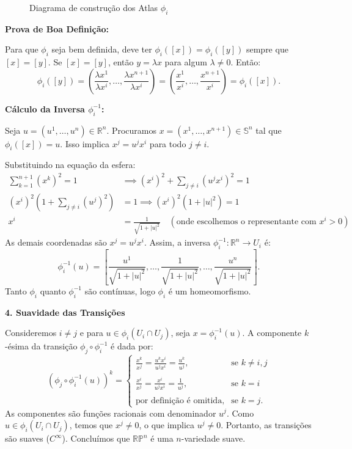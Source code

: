 {\begin{figure}[htbp]
		\caption{Diagrama de construção dos Atlas $\phi_i$}
	\end{figure}
	
	\textbf{Prova de Boa Definição:} 
	
	Para que $\phi_i$ seja bem definida, deve ter $\phi_i([x]) = \phi_i([y])$ sempre que $[x] = [y]$. Se $[x] = [y]$, então $y = \lambda x$ para algum $\lambda \neq 0$. Então:
	$$ \phi_i([y]) = \left( \frac{\lambda x^1}{\lambda x^i}, \dots, \frac{\lambda x^{n+1}}{\lambda x^i} \right) = \left( \frac{x^1}{x^i}, \dots, \frac{x^{n+1}}{x^i} \right) = \phi_i([x]).$$
	
	\textbf{Cálculo da Inversa $\phi_i^{-1}$:}
	
	Seja $u = (u^1, \dots, u^n) \in \mathbb{R}^n$. Procuramos $x = (x^1, \dots, x^{n+1}) \in \mathbb{S}^n$ tal que $\phi_i([x]) = u$. Isso implica $x^j = u^j x^i$ para todo $j \neq i$. 
	
	Substituindo na equação da esfera:
	\begin{align*}
		\sum_{k=1}^{n+1} (x^k)^2 = 1 &\implies (x^i)^2 + \sum_{j \neq i} (u^j x^i)^2 = 1 \\
		(x^i)^2 (1 + \sum_{j \neq i} (u^j)^2) &= 1 \implies (x^i)^2 (1 + |u|^2) = 1 \\
		x^i &= \frac{1}{\sqrt{1+|u|^2}} \quad (\text{onde escolhemos o representante com } x^i > 0)
	\end{align*}
	As demais coordenadas são $x^j = u^j x^i$. Assim, a inversa $\phi_i^{-1}: \mathbb{R}^n \to U_i$ é:
	$$ \phi_i^{-1}(u) = \left[ \frac{u^1}{\sqrt{1+|u|^2}}, \dots, \frac{1}{\sqrt{1+|u|^2}}, \dots, \frac{u^n}{\sqrt{1+|u|^2}} \right].$$
	Tanto $\phi_i$ quanto $\phi_i^{-1}$ são contínuas, logo $\phi_i$ é um homeomorfismo.
	
	\textbf{4. Suavidade das Transições}
	
	Consideremos $i \neq j$ e para $u \in \phi_i(U_i \cap U_j)$, seja $x = \phi_i^{-1}(u)$. A componente $k$-ésima da transição $\phi_j \circ \phi_i^{-1}$ é dada por:
	$$ 
	(\phi_j \circ \phi_i^{-1}(u))^k = \begin{cases} 
		\frac{x^k}{x^j} = \frac{u^k x^i}{u^j x^i} = \frac{u^k}{u^j}, & \text{se } k \neq i, j \\
		\\ 
		\frac{x^i}{x^j} = \frac{x^i}{u^j x^i} = \frac{1}{u^j}, & \text{se } k = i \\
		\\
		\text{por definição é omitida}, & \text{se } k = j.
	\end{cases} 
	$$
	As componentes são funções racionais com denominador $u^j$. Como $u \in \phi_i(U_i \cap U_j)$, temos que $x^j \neq 0$, o que implica $u^j \neq 0$. Portanto, as transições são suaves ($C^\infty$). Concluímos que $\mathbb{RP}^n$ é uma $n$-variedade suave.
}
